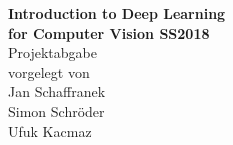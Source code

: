 \begin{titlepage}
	\begin{center}
	\vspace*{1cm}
	\LARGE\textbf{\textcolor{rubblue}{Introduction to Deep Learning\\for Computer Vision SS2018}}
	\large\textbf{\textcolor{rubgreen}{}}\\ 
\vspace*{4cm}
Projektabgabe\\
\vspace*{3.5cm}
vorgelegt von\\
\vspace*{1cm}
Jan Schaffranek\\
Simon Schröder\\
Ufuk Kacmaz\\
\vspace*{3.5cm}
\end{center}
\end{titlepage}